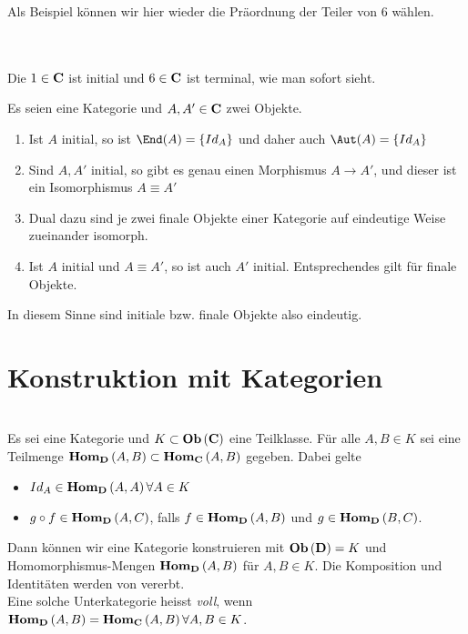 \documentclass{article}
\renewcommand{\id}{\ensuremath{Id}}
\begin{document}
	Als Beispiel k\"onnen wir hier wieder die Pr\"aordnung der Teiler von 6 w\"ahlen.\\
	\begin{bsp}\\
	 \\
	Die \( 1 \in \mathbf{C} \) ist initial und  \(6 \in \mathbf{C} \) ist terminal, wie man sofort sieht.

	\end{bsp}
	
	\begin{lem}[Eindeutigkeit]
	 {\cite[Lemma 2.5.5]{Bra}}
		Es seien \CatC eine Kategorie und 
		\(A , A' \in \mathbf{C} \) zwei Objekte.
		\begin{enumerate}
			\item Ist \(A \) initial, so ist \( \End(A)= \left\lbrace \id_A \right\rbrace \) und daher auch \( \Aut(A)=\left\lbrace \id_A \right\rbrace \)
			\item Sind \( A,A' \) initial, so gibt es genau einen Morphismus \( A \to A' \), und dieser ist ein Isomorphismus \( A \equiv A' \) 
			\item Dual dazu sind je zwei finale Objekte einer Kategorie auf eindeutige Weise zueinander isomorph.
			\item Ist \( A \) initial und \( A \equiv A' \), so ist auch \( A' \) initial. Entsprechendes gilt f\"ur finale Objekte.
		\end{enumerate}
		In diesem Sinne sind initiale bzw. finale Objekte also eindeutig.
	\end{lem}
\newpage

\section{Konstruktion mit Kategorien}

	\begin{defi}[Unterkategorie] {\cite[Definition 2.6.1]{Bra}} \\
		Es sei \CatC eine Kategorie und \( K \subset  \mathbf{Ob} \left(\mathbf{C}\right) \) eine Teilklasse. F\"ur alle \( A,B \in K \) sei eine Teilmenge
		\(
			 \mathbf{Hom } _\mathbf{D} \left( A, B \right) \subset  \mathbf{Hom } _\mathbf{C} \left( A, B \right)
		\)
		gegeben. Dabei gelte
			\begin{itemize}
				\item \( \id_A \in \Hom_\CatD \left( A, A \right) \forall A \in K \)
				\item \( g \circ f \in   \mathbf{Hom } _\mathbf{D} \left( A,C \right) \), 
					falls \( f \in  \mathbf{Hom } _\mathbf{D} \left( A, B \right) \) und  
					\( g \in  \mathbf{Hom } _\mathbf{D} \left( B , C \right) \).
			\end{itemize}

		Dann k\"onnen wir eine Kategorie \CatD konstruieren mit \(  \mathbf{Ob}  \left( \mathbf{D} \right) = K \) und Homomorphismus-Mengen \(  \mathbf{Hom } _\mathbf{D} \left(A,B \right) \) f\"ur \( A,B \in K \). Die Komposition und Identit\"aten werden von \CatC vererbt.
		\\
		Eine solche Unterkategorie heisst \emph{voll},
		wenn \(  \mathbf{Hom } _\mathbf{D} \left( A,B \right) =  \mathbf{Hom } _\mathbf{C} \left(A,B \right) \forall A,B \in K \). \\
	\end{defi}
 
\end{document}
